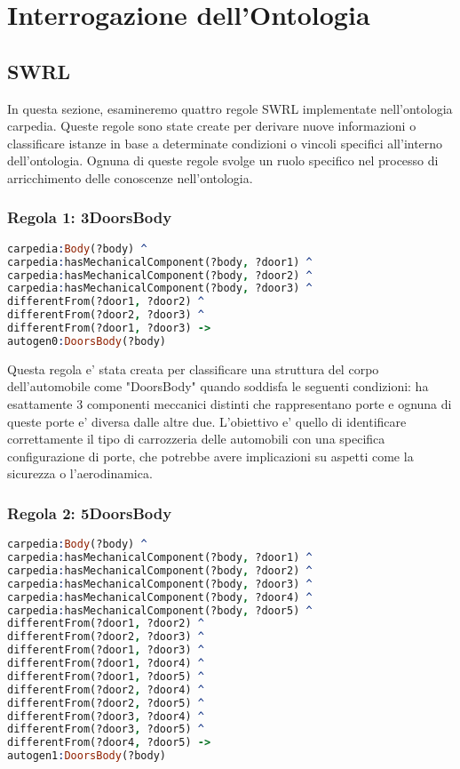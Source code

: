 \chapter{Interrogazione dell'Ontologia}

\section{SWRL}\label{sec:swrl}
In questa sezione, esamineremo quattro regole SWRL implementate nell'ontologia carpedia.
Queste regole sono state create per derivare nuove informazioni o classificare istanze in base a determinate
condizioni o vincoli specifici all'interno dell'ontologia.
Ognuna di queste regole svolge un ruolo specifico nel processo di arricchimento delle conoscenze nell'ontologia.

\subsection{Regola 1: 3DoorsBody}

\begin{lstlisting}[language=Prolog]
carpedia:Body(?body) ^
carpedia:hasMechanicalComponent(?body, ?door1) ^
carpedia:hasMechanicalComponent(?body, ?door2) ^
carpedia:hasMechanicalComponent(?body, ?door3) ^
differentFrom(?door1, ?door2) ^
differentFrom(?door2, ?door3) ^
differentFrom(?door1, ?door3) ->
autogen0:DoorsBody(?body)
\end{lstlisting}


Questa regola e' stata creata per classificare una struttura del corpo dell'automobile come "DoorsBody" quando
soddisfa le seguenti condizioni: ha esattamente 3 componenti meccanici distinti che rappresentano porte e ognuna
di queste porte e' diversa dalle altre due.
L'obiettivo e' quello di identificare correttamente il tipo di carrozzeria delle automobili con una
specifica configurazione di porte, che potrebbe avere implicazioni su aspetti come la sicurezza o l'aerodinamica.

\subsection{Regola 2: 5DoorsBody}

\begin{lstlisting}[language=Prolog]
carpedia:Body(?body) ^
carpedia:hasMechanicalComponent(?body, ?door1) ^
carpedia:hasMechanicalComponent(?body, ?door2) ^
carpedia:hasMechanicalComponent(?body, ?door3) ^
carpedia:hasMechanicalComponent(?body, ?door4) ^
carpedia:hasMechanicalComponent(?body, ?door5) ^
differentFrom(?door1, ?door2) ^
differentFrom(?door2, ?door3) ^
differentFrom(?door1, ?door3) ^
differentFrom(?door1, ?door4) ^
differentFrom(?door1, ?door5) ^
differentFrom(?door2, ?door4) ^
differentFrom(?door2, ?door5) ^
differentFrom(?door3, ?door4) ^
differentFrom(?door3, ?door5) ^
differentFrom(?door4, ?door5) ->
autogen1:DoorsBody(?body)
\end{lstlisting}


